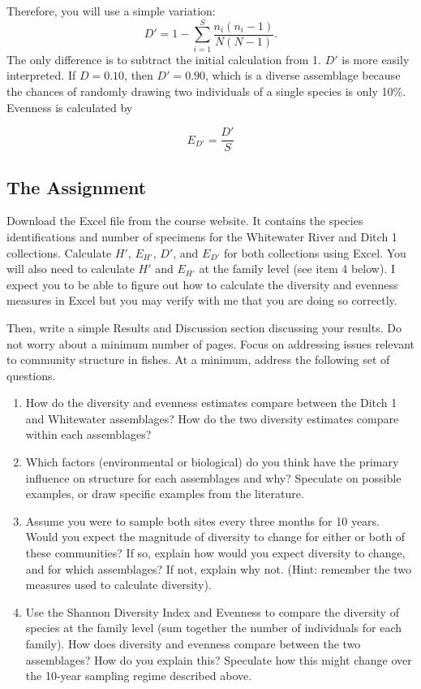 \documentclass[11pt]{article}
\begin{document}
Therefore, you will use a simple variation:
\begin{equation*}
D' = 1 - \sum_{i=1}^{S} \frac{n_i(n_i-1)}{N(N-1)}.
\end{equation*}
The only difference is to subtract the initial calculation from 1. $D'$ is more easily interpreted. If $D = 0.10$, then $D' = 0.90$, which is a diverse assemblage because the chances of randomly drawing two individuals of a single species is only 10\%.  Evenness is calculated by

\begin{equation*}
E_{D'} = \frac{D'}{S}
\end{equation*}

\subsection*{The Assignment}

Download the Excel file from the course website. It contains the species identifications and number of specimens for the Whitewater River and Ditch 1 collections. Calculate $H'$, $E_{H'}$, $D'$, and $E_{D'}$ for both collections using Excel.  You will also need to calculate $H'$ and $E_{H'}$ at the family level (see item 4 below). I expect you to be able to figure out how to calculate the diversity and evenness measures in Excel but you may verify with me that you are doing so correctly.

Then, write a simple Results and Discussion section discussing your results.  Do not worry about a minimum number of pages.  Focus on addressing issues relevant to community structure in fishes.  At a minimum, address the following set of questions.
\begin{enumerate}
\item How do the diversity and evenness estimates compare between the Ditch 1 and Whitewater assemblages?  How do the two diversity estimates compare within each assemblages?

\item Which factors (environmental or biological) do you think have the primary influence on structure for each assemblages and why?  Speculate on possible examples, or draw specific examples from the literature.

\item Assume you were to sample both sites every three months for 10 years.  Would you expect the magnitude of diversity to change for either or both of these communities?  If so, explain how would you expect diversity to change, and for which assemblages?  If not, explain why not.  (Hint: remember the two measures used to calculate diversity).  

\item Use the Shannon Diversity Index and Evenness to compare the diversity of species at the family level (sum together the number of individuals for each family).  How does diversity and evenness compare between the two assemblages?  How do you explain this?  Speculate how this might change over the 10-year sampling regime described above.
\end{enumerate}
\end{document}
